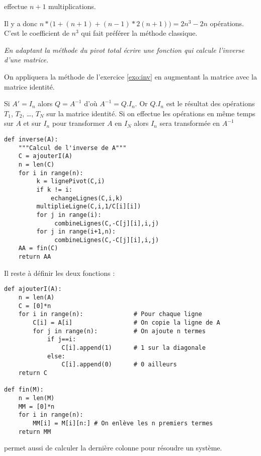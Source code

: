 \begin{Answer}
 effectue $n+1$ multiplications.

Il y a donc $n*\bigl(1+(n+1)+(n-1)*2(n+1)\bigr)=2n^3-2n$ opérations. C'est le coefficient de $n^3$ qui fait préférer la méthode classique.
\end{Answer}
\begin{Exercise}[title=Inverse]\it 
En adaptant la méthode du pivot total écrire une fonction qui calcule l'inverse d'une matrice.

On appliquera la méthode de l'exercice \ref{exo:inv} en augmentant la matrice avec la matrice identité.
\end{Exercise}
\begin{Answer}
Si $A'=I_n$ alors $Q=A^{-1}$ d'où $A^{-1}=Q.I_n$. Or $Q.I_n$ est le résultat des opérations $T_1$, $T_2$, \dots, $T_N$ sur la matrice identité. Si on effectue les opérations en même temps sur $A$ et sur $I_n$ pour transformer $A$ en $I_N$ alors $I_n$ sera transformée en $A^{-1}$

\begin{lstlisting}
def inverse(A):
    """Calcul de l'inverse de A"""
    C = ajouterI(A)
    n = len(C)
    for i in range(n):
         k = lignePivot(C,i)
         if k != i: 
             echangeLignes(C,i,k)
         multiplieLigne(C,i,1/C[i][i])
         for j in range(i):
              combineLignes(C,-C[j][i],i,j)
         for j in range(i+1,n):
              combineLignes(C,-C[j][i],i,j)
    AA = fin(C)
    return AA
\end{lstlisting}

\newpage

Il reste à définir les deux fonctions :

\begin{lstlisting}
def ajouterI(A):
    n = len(A)
    C = [0]*n
    for i in range(n):              # Pour chaque ligne
        C[i] = A[i]                 # On copie la ligne de A
        for j in range(n):          # On ajoute n termes
            if j==i: 
                C[i].append(1)      # 1 sur la diagonale
            else:    
                C[i].append(0)      # 0 ailleurs
    return C

def fin(M):
    n = len(M)
    MM = [0]*n
    for i in range(n):
        MM[i] = M[i][n:] # On enlève les n premiers termes
    return MM
\end{lstlisting}
 permet aussi de calculer la dernière colonne pour résoudre un système.
\end{Answer}
